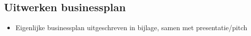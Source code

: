 \subsection {Uitwerken businessplan}

\begin{itemize}
  \item Eigenlijke businessplan uitgeschreven in bijlage, samen met presentatie/pitch
\end{itemize}
% 
